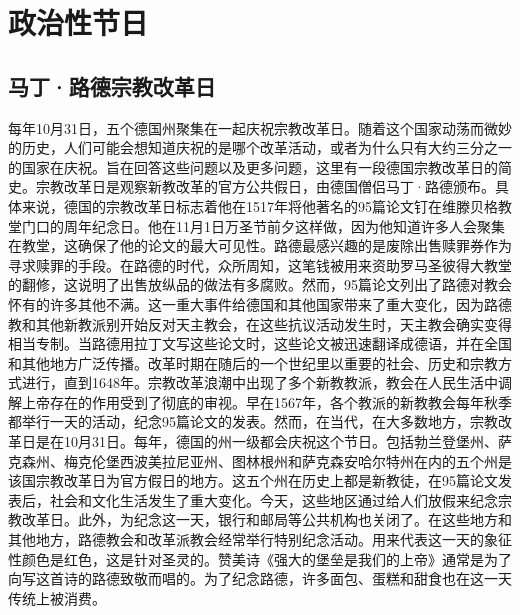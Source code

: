 \section{政治性节日}

\subsection{马丁·路德宗教改革日}

每年10月31日，五个德国州聚集在一起庆祝宗教改革日。随着这个国家动荡而微妙的历史，人们可能会想知道庆祝的是哪个改革活动，或者为什么只有大约三分之一的国家在庆祝。旨在回答这些问题以及更多问题，这里有一段德国宗教改革日的简史。宗教改革日是观察新教改革的官方公共假日，由德国僧侣马丁·路德颁布。具体来说，德国的宗教改革日标志着他在1517年将他著名的95篇论文钉在维滕贝格教堂门口的周年纪念日。他在11月1日万圣节前夕这样做，因为他知道许多人会聚集在教堂，这确保了他的论文的最大可见性。路德最感兴趣的是废除出售赎罪券作为寻求赎罪的手段。在路德的时代，众所周知，这笔钱被用来资助罗马圣彼得大教堂的翻修，这说明了出售放纵品的做法有多腐败。然而，95篇论文列出了路德对教会怀有的许多其他不满。这一重大事件给德国和其他国家带来了重大变化，因为路德教和其他新教派别开始反对天主教会，在这些抗议活动发生时，天主教会确实变得相当专制。当路德用拉丁文写这些论文时，这些论文被迅速翻译成德语，并在全国和其他地方广泛传播。改革时期在随后的一个世纪里以重要的社会、历史和宗教方式进行，直到1648年。宗教改革浪潮中出现了多个新教教派，教会在人民生活中调解上帝存在的作用受到了彻底的审视。早在1567年，各个教派的新教教会每年秋季都举行一天的活动，纪念95篇论文的发表。然而，在当代，在大多数地方，宗教改革日是在10月31日。每年，德国的州一级都会庆祝这个节日。包括勃兰登堡州、萨克森州、梅克伦堡西波美拉尼亚州、图林根州和萨克森安哈尔特州在内的五个州是该国宗教改革日为官方假日的地方。这五个州在历史上都是新教徒，在95篇论文发表后，社会和文化生活发生了重大变化。今天，这些地区通过给人们放假来纪念宗教改革日。此外，为纪念这一天，银行和邮局等公共机构也关闭了。在这些地方和其他地方，路德教会和改革派教会经常举行特别纪念活动。用来代表这一天的象征性颜色是红色，这是针对圣灵的。赞美诗《强大的堡垒是我们的上帝》通常是为了向写这首诗的路德致敬而唱的。为了纪念路德，许多面包、蛋糕和甜食也在这一天传统上被消费。

